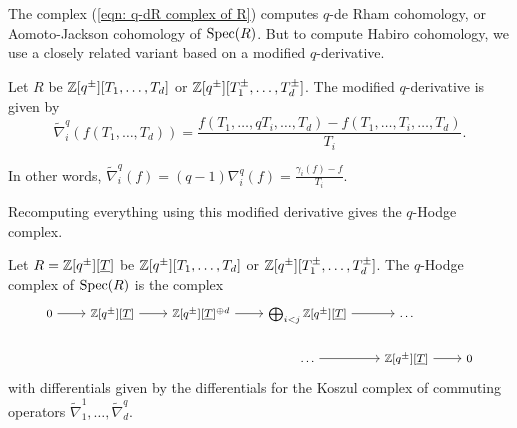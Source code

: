 The complex (\ref{eqn: q-dR complex of R}) computes $q$-de Rham cohomology, or Aomoto-Jackson cohomology of $\operatorname{Spec}(R)$. But to compute Habiro cohomology, we use a closely related variant based on a modified $q$-derivative. 
\begin{definition}\label{def: modified q-derivative}
    Let $R$ be $\mathbb{Z}[q^{\pm}][T_{1},\dots,T_{d}]$ or $\mathbb{Z}[q^{\pm}][T_{1}^{\pm},\dots,T_{d}^{\pm}]$. The modified $q$-derivative is given by 
    $$\widetilde{\nabla}_{i}^{q}(f(T_{1},\dots,T_{d}))=\frac{f(T_{1},\dots,qT_{i},\dots,T_{d})-f(T_{1},\dots,T_{i},\dots,T_{d})}{T_{i}}.$$
\end{definition}
\begin{remark}
    In other words, $\widetilde{\nabla}_{i}^{q}(f)=(q-1)\nabla_{i}^{q}(f)=\frac{\gamma_{i}(f)-f}{T_{i}}$.  
\end{remark}
Recomputing everything using this modified derivative gives the $q$-Hodge complex. 
\begin{definition}\label{def: q-Hodge complex}
    Let $R=\mathbb{Z}[q^{\pm}][\underline{T}]$ be $\mathbb{Z}[q^{\pm}][T_{1},\dots,T_{d}]$ or $\mathbb{Z}[q^{\pm}][T_{1}^{\pm},\dots,T_{d}^{\pm}]$. The $q$-Hodge complex of $\operatorname{Spec}(R)$ is the complex
    \begin{equation}\label{eqn: q-Hodge complex of R}
        \footnotesize 
        \begin{tikzcd}
            0 & {\ZZ[q^{\pm}][\underline{T}]} & {\ZZ[q^{\pm}][\underline{T}]^{\oplus d}} & {\bigoplus_{i<j}\ZZ[q^{\pm}][\underline{T}]} & \dots \\
            &&& \dots & {\ZZ[q^{\pm}][\underline{T}]} & 0
            \arrow[from=1-1, to=1-2]
            \arrow[from=1-2, to=1-3]
            \arrow[from=1-3, to=1-4]
            \arrow[from=1-4, to=1-5]
            \arrow[from=2-4, to=2-5]
            \arrow[from=2-5, to=2-6]
        \end{tikzcd}
        \normalsize
    \end{equation}
    with differentials given by the differentials for the Koszul complex of commuting operators $\widetilde{\nabla}_{1}^{1},\dots,\widetilde{\nabla}_{d}^{q}$. 
\end{definition}
